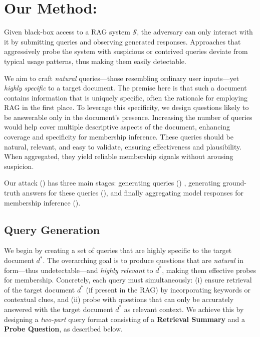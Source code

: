 \section{Our Method: \ourattackfull}
\label{sec:method}


Given black-box access to a RAG system $\mathcal{S}$, the adversary can only interact with it by submitting queries and observing generated responses. Approaches that aggressively probe the system with suspicious or contrived queries deviate from typical usage patterns, thus making them easily detectable. 



We aim to craft \emph{natural} queries---those resembling ordinary user inputs---yet \emph{highly specific} to a target document. The premise here is that such a document contains information that is uniquely specific, often the rationale for employing RAG in the first place. To leverage this specificity, we design questions likely to be answerable only in the document's presence. Increasing the number of queries would help cover multiple descriptive aspects of the document, enhancing coverage and specificity for membership inference. These queries should be natural, relevant, and easy to validate, ensuring effectiveness and plausibility. When aggregated, they yield reliable membership signals without arousing suspicion.

Our attack (\ourattack) has three main stages: generating queries ()
, generating ground-truth answers for these queries (), and finally aggregating model responses for membership inference ().


\subsection{Query Generation}
\label{sec:query-generation}

We begin by creating a set of queries that are highly specific to the target document $d^*$. The overarching goal is to produce questions that are \emph{natural} in form—thus undetectable—and \emph{highly relevant} to $d^*$, making them effective probes for membership. Concretely, each query must simultaneously: (i) ensure retrieval of the target document $d^*$ (if present in the RAG) by incorporating keywords or contextual clues, and (ii) probe with questions that can only be accurately answered with the target document $d^*$ as relevant context. We achieve this by designing a \emph{two-part} query format consisting of a \textbf{Retrieval Summary} and a \textbf{Probe Question}, as described below.

